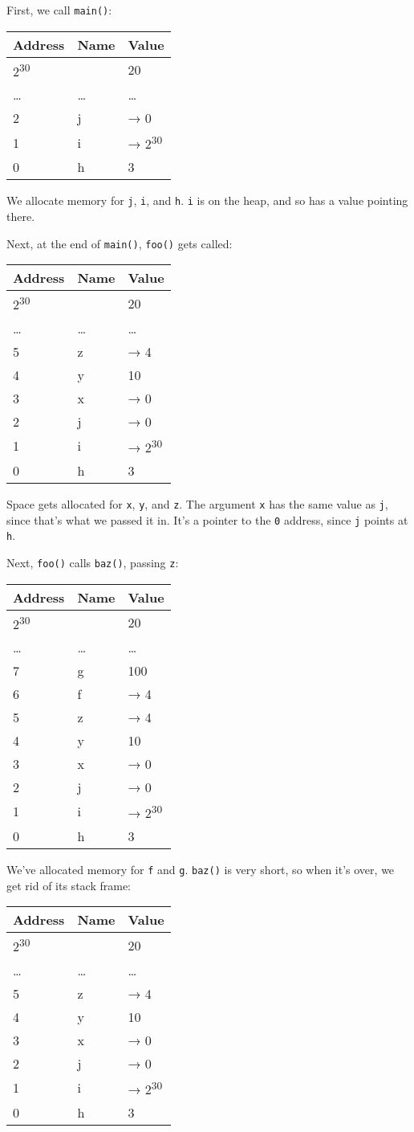 \documentclass[a4paper,]{book}
\begin{document}
First, we call \texttt{main()}:

\begin{longtable}[c]{@{}lll@{}}
\toprule
Address & Name & Value\tabularnewline
\midrule
\endhead
2\textsuperscript{30} & & 20\tabularnewline
\ldots{} & \ldots{} & \ldots{}\tabularnewline
2 & j & → 0\tabularnewline
1 & i & → 2\textsuperscript{30}\tabularnewline
0 & h & 3\tabularnewline
\bottomrule
\end{longtable}

We allocate memory for \texttt{j}, \texttt{i}, and \texttt{h}.
\texttt{i} is on the heap, and so has a value pointing there.

Next, at the end of \texttt{main()}, \texttt{foo()} gets called:

\begin{longtable}[c]{@{}lll@{}}
\toprule
Address & Name & Value\tabularnewline
\midrule
\endhead
2\textsuperscript{30} & & 20\tabularnewline
\ldots{} & \ldots{} & \ldots{}\tabularnewline
5 & z & → 4\tabularnewline
4 & y & 10\tabularnewline
3 & x & → 0\tabularnewline
2 & j & → 0\tabularnewline
1 & i & → 2\textsuperscript{30}\tabularnewline
0 & h & 3\tabularnewline
\bottomrule
\end{longtable}

Space gets allocated for \texttt{x}, \texttt{y}, and \texttt{z}. The
argument \texttt{x} has the same value as \texttt{j}, since that's what
we passed it in. It's a pointer to the \texttt{0} address, since
\texttt{j} points at \texttt{h}.

Next, \texttt{foo()} calls \texttt{baz()}, passing \texttt{z}:

\begin{longtable}[c]{@{}lll@{}}
\toprule
Address & Name & Value\tabularnewline
\midrule
\endhead
2\textsuperscript{30} & & 20\tabularnewline
\ldots{} & \ldots{} & \ldots{}\tabularnewline
7 & g & 100\tabularnewline
6 & f & → 4\tabularnewline
5 & z & → 4\tabularnewline
4 & y & 10\tabularnewline
3 & x & → 0\tabularnewline
2 & j & → 0\tabularnewline
1 & i & → 2\textsuperscript{30}\tabularnewline
0 & h & 3\tabularnewline
\bottomrule
\end{longtable}

We've allocated memory for \texttt{f} and \texttt{g}. \texttt{baz()} is
very short, so when it's over, we get rid of its stack frame:

\begin{longtable}[c]{@{}lll@{}}
\toprule
Address & Name & Value\tabularnewline
\midrule
\endhead
2\textsuperscript{30} & & 20\tabularnewline
\ldots{} & \ldots{} & \ldots{}\tabularnewline
5 & z & → 4\tabularnewline
4 & y & 10\tabularnewline
3 & x & → 0\tabularnewline
2 & j & → 0\tabularnewline
1 & i & → 2\textsuperscript{30}\tabularnewline
0 & h & 3\tabularnewline
\bottomrule
\end{longtable}
\end{document}
